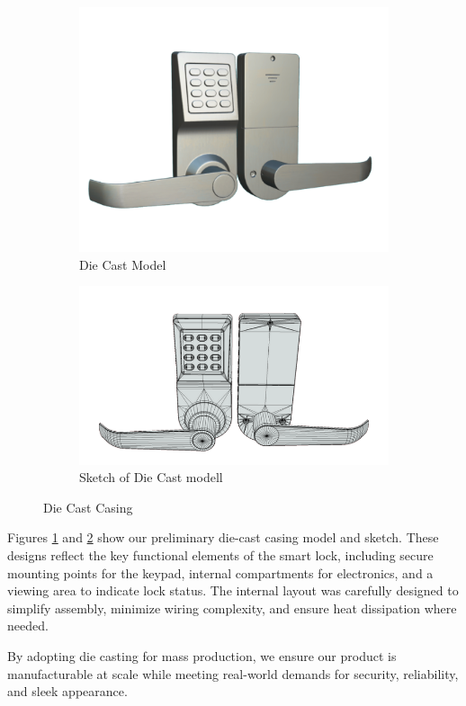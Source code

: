 \begin{figure}[!ht]
\centering
\begin{subfigure}{.5\textwidth}
  \centering
  \includegraphics[width=.7\linewidth]{img/dieCast1.png}
  \caption{Die Cast Model}
  \label{fig:dieCast1}
\end{subfigure}%
\begin{subfigure}{.5\textwidth}
  \centering
  \includegraphics[width=.7\linewidth]{img/dieCast2.png}
  \caption{Sketch of Die Cast modell}
  \label{fig:dieCast2}
\end{subfigure}
\caption{Die Cast Casing}
\label{fig:dieCast}
\end{figure}

Figures \ref{fig:dieCast1} and \ref{fig:dieCast2} show our preliminary die-cast casing model and sketch. These designs reflect the key functional elements of the smart lock, including secure mounting points for the keypad, internal compartments for electronics, and a viewing area to indicate lock status. The internal layout was carefully designed to simplify assembly, minimize wiring complexity, and ensure heat dissipation where needed.

By adopting die casting for mass production, we ensure our product is manufacturable at scale while meeting real-world demands for security, reliability, and sleek appearance.